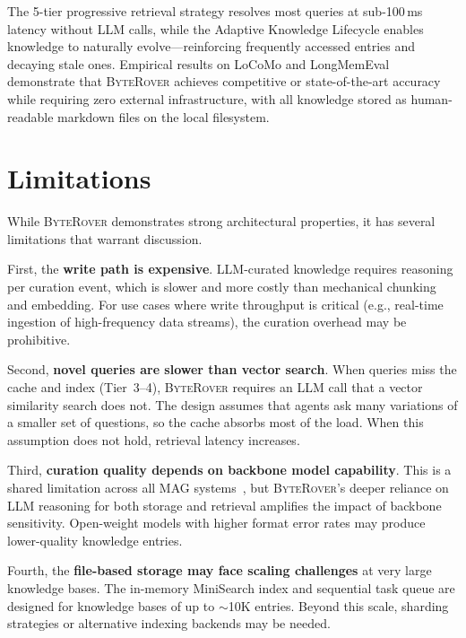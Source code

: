 \documentclass[11pt]{article}
\newcommand{\byterover}{\textsc{ByteRover}}
\begin{document}
The 5-tier progressive retrieval strategy resolves most queries at sub-100\,ms latency
without LLM calls, while the Adaptive Knowledge Lifecycle enables knowledge
to naturally evolve---reinforcing frequently accessed entries and decaying stale ones.
Empirical results on LoCoMo and LongMemEval demonstrate that \byterover{}
achieves competitive or state-of-the-art accuracy while requiring
zero external infrastructure, with all knowledge stored as human-readable markdown files
on the local filesystem.


\section{Limitations}
\label{sec:limitations}

While \byterover{} demonstrates strong architectural properties,
it has several limitations that warrant discussion.

First, the \textbf{write path is expensive}.
LLM-curated knowledge requires reasoning per curation event,
which is slower and more costly than mechanical chunking and embedding.
For use cases where write throughput is critical
(e.g., real-time ingestion of high-frequency data streams),
the curation overhead may be prohibitive.

Second, \textbf{novel queries are slower than vector search}.
When queries miss the cache and index (Tier~3--4),
\byterover{} requires an LLM call that a vector similarity search does not.
The design assumes that agents ask many variations of a smaller set of questions,
so the cache absorbs most of the load.
When this assumption does not hold, retrieval latency increases.

Third, \textbf{curation quality depends on backbone model capability}.
This is a shared limitation across all MAG systems~\citep{jiang2026anatomy},
but \byterover{}'s deeper reliance on LLM reasoning for both storage and retrieval
amplifies the impact of backbone sensitivity.
Open-weight models with higher format error rates may produce
lower-quality knowledge entries.

Fourth, the \textbf{file-based storage may face scaling challenges} at very large knowledge bases.
The in-memory MiniSearch index and sequential task queue are designed for
knowledge bases of up to $\sim$10K entries.
Beyond this scale, sharding strategies or alternative indexing backends may be needed.
\end{document}
